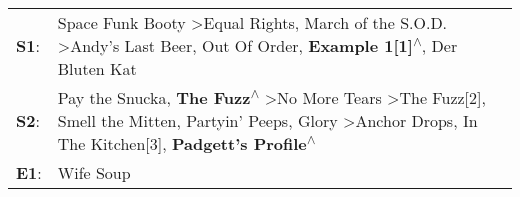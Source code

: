 \begin{supertabular}{p{0.03\textwidth}p{0.92\textwidth}}
 \textbf{S1}:  &                                                                                                                                                Space Funk Booty\textsuperscript{} \textgreater \enspace Equal Rights\textsuperscript{}, \enspace March of the S.O.D.\textsuperscript{} \textgreater \enspace Andy's Last Beer\textsuperscript{}, \enspace Out Of Order\textsuperscript{}, \enspace \textbf{Example 1[1]\textsuperscript{$\wedge$}}, \enspace Der Bluten Kat\textsuperscript{}  \enspace  \\
 \textbf{S2}:  &  Pay the Snucka\textsuperscript{}, \enspace \textbf{The Fuzz\textsuperscript{$\wedge$}} \textgreater \enspace No More Tears\textsuperscript{} \textgreater \enspace The Fuzz[2]\textsuperscript{}, \enspace Smell the Mitten\textsuperscript{}, \enspace Partyin' Peeps\textsuperscript{}, \enspace Glory\textsuperscript{} \textgreater \enspace Anchor Drops\textsuperscript{}, \enspace In The Kitchen[3]\textsuperscript{}, \enspace \textbf{Padgett's Profile\textsuperscript{$\wedge$}}  \enspace  \\
 \textbf{E1}:  &                                                                                                                                                                                                                                                                                                                                                                                                                                                                   Wife Soup\textsuperscript{}  \enspace  \\
\end{supertabular}
